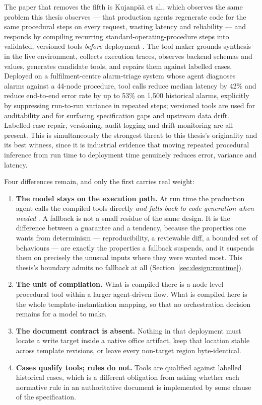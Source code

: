 The paper that removes the fifth is Kujanpää et al., which observes the same problem this
thesis observes --- that production agents regenerate code for the same procedural steps on
every request, wasting latency and reliability --- and responds by compiling recurring
standard-operating-procedure steps into validated, versioned tools \emph{before} deployment
\cite{kujanpaa2026toolmaking}. The tool maker grounds synthesis in the live environment,
collects execution traces, observes backend schemas and values, generates candidate tools, and
repairs them against labelled cases. Deployed on a fulfilment-centre alarm-triage system whose
agent diagnoses alarms against a 44-node procedure, tool calls reduce median latency by 42\% and
reduce end-to-end error rate by up to 53\% on 1{,}500 historical alarms, explicitly by
suppressing run-to-run variance in repeated steps; versioned tools are used for auditability and
for surfacing specification gaps and upstream data drift. Labelled-case repair, versioning,
audit logging and drift monitoring are all present. This is simultaneously the strongest threat
to this thesis's originality and its best witness, since it is industrial evidence that moving
repeated procedural inference from run time to deployment time genuinely reduces error, variance
and latency.

Four differences remain, and only the first carries real weight:

\begin{enumerate}
  \item \textbf{The model stays on the execution path.} At run time the production agent calls
    the compiled tools directly \emph{and falls back to code generation when needed}
    \cite{kujanpaa2026toolmaking}. A fallback is not a small residue of the same design. It is
    the difference between a guarantee and a tendency, because the properties one wants from
    determinism --- reproducibility, a reviewable diff, a bounded set of behaviours --- are
    exactly the properties a fallback suspends, and it suspends them on precisely the unusual
    inputs where they were wanted most. This thesis's boundary admits no fallback at all
    (Section~\ref{sec:design:runtime}).
  \item \textbf{The unit of compilation.} What is compiled there is a node-level procedural
    tool within a larger agent-driven flow. What is compiled here is the whole
    template-instantiation mapping, so that no orchestration decision remains for a model to
    make.
  \item \textbf{The document contract is absent.} Nothing in that deployment must locate a
    write target inside a native office artifact, keep that location stable across template
    revisions, or leave every non-target region byte-identical.
  \item \textbf{Cases qualify tools; rules do not.} Tools are qualified against labelled
    historical cases, which is a different obligation from asking whether each normative rule
    in an authoritative document is implemented by some clause of the specification.
\end{enumerate}

